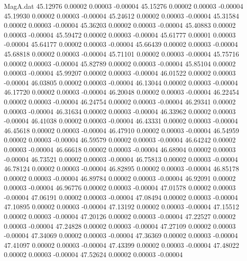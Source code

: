 \begin{filecontents}{MagA.dat}
  45.12976    0.00002    0.00003   -0.00004
  45.15276    0.00002    0.00003   -0.00004
  45.19930    0.00002    0.00003   -0.00004
  45.24612    0.00002    0.00003   -0.00004
  45.31584    0.00002    0.00003   -0.00004
  45.36203    0.00002    0.00003   -0.00004
  45.40883    0.00002    0.00003   -0.00004
  45.59472    0.00002    0.00003   -0.00004
  45.61777    0.00001    0.00003   -0.00004
  45.64177    0.00002    0.00003   -0.00004
  45.66439    0.00002    0.00003   -0.00004
  45.68818    0.00002    0.00003   -0.00004
  45.71101    0.00002    0.00003   -0.00004
  45.75716    0.00002    0.00003   -0.00004
  45.82789    0.00002    0.00003   -0.00004
  45.85104    0.00002    0.00003   -0.00004
  45.99207    0.00002    0.00003   -0.00004
  46.01522    0.00002    0.00003   -0.00004
  46.03805    0.00002    0.00003   -0.00004
  46.13044    0.00002    0.00003   -0.00004
  46.17720    0.00002    0.00003   -0.00004
  46.20048    0.00002    0.00003   -0.00004
  46.22454    0.00002    0.00003   -0.00004
  46.24754    0.00002    0.00003   -0.00004
  46.29341    0.00002    0.00003   -0.00004
  46.31634    0.00002    0.00003   -0.00004
  46.33962    0.00002    0.00003   -0.00004
  46.41038    0.00002    0.00003   -0.00004
  46.43331    0.00002    0.00003   -0.00004
  46.45618    0.00002    0.00003   -0.00004
  46.47910    0.00002    0.00003   -0.00004
  46.54959    0.00002    0.00003   -0.00004
  46.59579    0.00002    0.00003   -0.00004
  46.64242    0.00002    0.00003   -0.00004
  46.66618    0.00002    0.00003   -0.00004
  46.68904    0.00002    0.00003   -0.00004
  46.73521    0.00002    0.00003   -0.00004
  46.75813    0.00002    0.00003   -0.00004
  46.78124    0.00002    0.00003   -0.00004
  46.82895    0.00002    0.00003   -0.00004
  46.85178    0.00002    0.00003   -0.00004
  46.89784    0.00002    0.00003   -0.00004
  46.92091    0.00002    0.00003   -0.00004
  46.96776    0.00002    0.00003   -0.00004
  47.01578    0.00002    0.00003   -0.00004
  47.06191    0.00002    0.00003   -0.00004
  47.08494    0.00002    0.00003   -0.00004
  47.10895    0.00002    0.00003   -0.00004
  47.13192    0.00002    0.00003   -0.00004
  47.15512    0.00002    0.00003   -0.00004
  47.20126    0.00002    0.00003   -0.00004
  47.22527    0.00002    0.00003   -0.00004
  47.24828    0.00002    0.00003   -0.00004
  47.27109    0.00002    0.00003   -0.00004
  47.34069    0.00002    0.00003   -0.00004
  47.36369    0.00002    0.00003   -0.00004
  47.41097    0.00002    0.00003   -0.00004
  47.43399    0.00002    0.00003   -0.00004
  47.48022    0.00002    0.00003   -0.00004
  47.52624    0.00002    0.00003   -0.00004

\end{filecontents}
